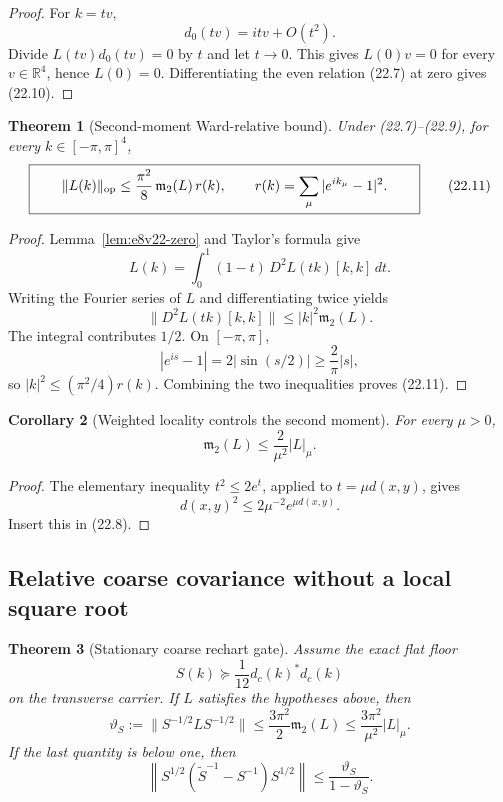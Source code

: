 \documentclass[11pt,oneside]{book}
\newtheorem{theorem}{Theorem}[chapter]
\newtheorem{corollary}[theorem]{Corollary}
\theoremstyle{definition}
\theoremstyle{remark}
\begin{document}
\begin{proof}
For \(k=tv\),
\[
 d_0(tv)=itv+O(t^2).
\]
Divide \(L(tv)d_0(tv)=0\) by \(t\) and let \(t\to0\).  This gives
\(L(0)v=0\) for every \(v\in\mathbb R^4\), hence \(L(0)=0\).
Differentiating the even relation (22.7) at zero gives (22.10).
\end{proof}

\begin{theorem}[Second-moment Ward-relative bound]
\label{thm:e8v22-second-moment}
Under (22.7)--(22.9), for every
\(k\in[-\pi,\pi]^4\),
\[
\boxed{\qquad
\|L(k)\|_{\rm op}
\leq\frac{\pi^2}{8}\,\mathfrak m_2(L)\,
            r(k),\qquad
r(k)=\sum_\mu|e^{ik_\mu}-1|^2.
\qquad}                                                           \tag{22.11}
\]
\end{theorem}

\begin{proof}
Lemma~\ref{lem:e8v22-zero} and Taylor's formula give
\[
 L(k)=\int_0^1(1-t)\,D^2L(tk)[k,k]\,dt.
\]
Writing the Fourier series of \(L\) and differentiating twice yields
\[
\|D^2L(tk)[k,k]\|
\leq |k|^2\mathfrak m_2(L).
\]
The integral contributes \(1/2\).  On \([-\pi,\pi]\),
\[
 |e^{is}-1|=2|\sin(s/2)|\geq\frac{2}{\pi}|s|,
\]
so \(|k|^2\leq(\pi^2/4)r(k)\).  Combining the two inequalities proves
(22.11).
\end{proof}

\begin{corollary}[Weighted locality controls the second moment]
\label{cor:e8v22-moment}
For every \(\mu>0\),
\[
\boxed{\qquad
\mathfrak m_2(L)\leq\frac{2}{\mu^2}|L|_\mu.
\qquad}                                                           \tag{22.12}
\]
\end{corollary}

\begin{proof}
The elementary inequality \(t^2\leq2e^t\), applied to
\(t=\mu d(x,y)\), gives
\[
d(x,y)^2\leq2\mu^{-2}e^{\mu d(x,y)}.
\]
Insert this in (22.8).
\end{proof}

\subsection{Relative coarse covariance without a local square root}

\begin{theorem}[Stationary coarse rechart gate]
\label{thm:e8v22-coarse-gate}
Assume the exact flat floor
\[
                         S(k)\succeq\frac1{12}d_c(k)^*d_c(k)        \tag{22.13}
\]
on the transverse carrier.  If \(L\) satisfies the hypotheses above,
then
\[
\boxed{\quad
\vartheta_S:=
\|S^{-1/2}LS^{-1/2}\|
\leq\frac{3\pi^2}{2}\mathfrak m_2(L)
\leq\frac{3\pi^2}{\mu^2}|L|_\mu.
\quad}                                                            \tag{22.14}
\]
If the last quantity is below one, then
\[
\boxed{\quad
\left\|S^{1/2}(\widetilde S^{-1}-S^{-1})S^{1/2}\right\|
\leq\frac{\vartheta_S}{1-\vartheta_S}.
\quad}                                                            \tag{22.15}
\]
\end{theorem}
\end{document}
